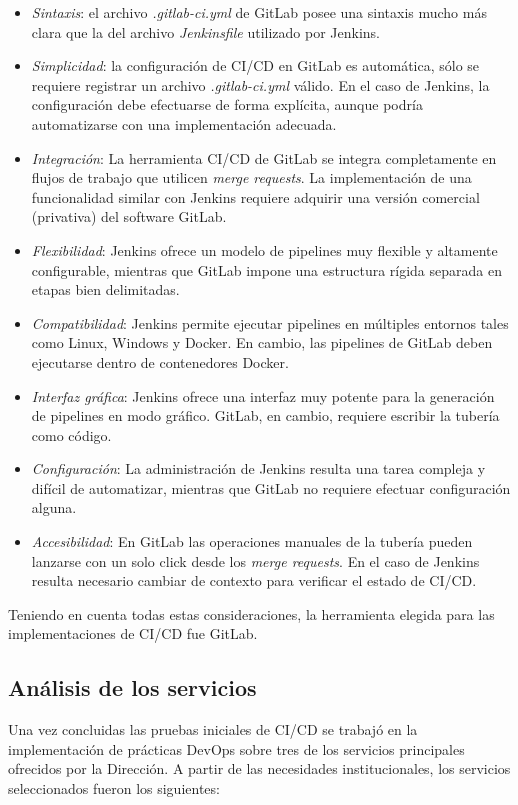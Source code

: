 \begin{itemize}
\item \textit{Sintaxis}: el archivo \textit{.gitlab-ci.yml} de GitLab posee una sintaxis mucho más clara que la del archivo \textit{Jenkinsfile} utilizado por Jenkins.
\item \textit{Simplicidad}: la configuración de CI/CD en GitLab es automática, sólo se requiere registrar un archivo \textit{.gitlab-ci.yml} válido. En el caso de Jenkins, la configuración debe efectuarse de forma explícita, aunque podría automatizarse con una implementación adecuada.
\item \textit{Integración}: La herramienta CI/CD de GitLab se integra completamente en  flujos de trabajo que utilicen \textit{merge requests}. La implementación de una funcionalidad similar con Jenkins requiere adquirir una versión comercial (privativa) del software GitLab.
\item \textit{Flexibilidad}: Jenkins ofrece un modelo de pipelines muy flexible y altamente configurable, mientras que GitLab impone una estructura rígida separada en etapas bien delimitadas.
\item \textit{Compatibilidad}: Jenkins permite ejecutar pipelines en múltiples entornos tales como Linux, Windows y Docker. En cambio, las pipelines de GitLab deben ejecutarse dentro de contenedores Docker.
\item \textit{Interfaz gráfica}: Jenkins ofrece una interfaz muy potente para la generación de pipelines en modo gráfico. GitLab, en cambio, requiere escribir la tubería como código.
\item \textit{Configuración}: La administración de Jenkins resulta una tarea compleja y difícil de automatizar, mientras que GitLab no requiere efectuar configuración alguna.
\item \textit{Accesibilidad}: En GitLab las operaciones manuales de la tubería pueden lanzarse con un solo click desde los \textit{merge requests}. En el caso de Jenkins resulta necesario cambiar de contexto para verificar el estado de CI/CD.
\end{itemize}
Teniendo en cuenta todas estas consideraciones, la herramienta elegida para las implementaciones de CI/CD fue GitLab.

\subsection{Análisis de los servicios}

Una vez concluidas las pruebas iniciales de CI/CD se trabajó en la implementación de prácticas DevOps sobre tres de los servicios principales ofrecidos por la Dirección. A partir de las necesidades institucionales, los servicios seleccionados fueron los siguientes:

